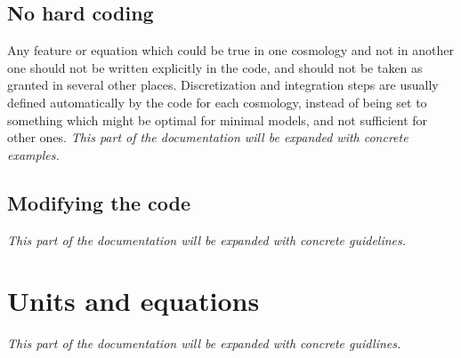\documentclass{article}
\begin{document}
\subsection{No hard coding}

Any feature or equation which could be true in one cosmology and not in another one should not be written explicitly in the code, and should not be taken as granted in several other places. Discretization and integration steps are usually defined automatically by the code for each cosmology, instead of being set to something which might be optimal for minimal models, and not sufficient for other ones.
{\it This part of the documentation will be expanded with concrete examples.}

\subsection{Modifying the code}

{\it This part of the documentation will be expanded with concrete guidelines.}

\section{Units and equations}

{\it This part of the documentation will be expanded with concrete guidlines.}
\end{document}
